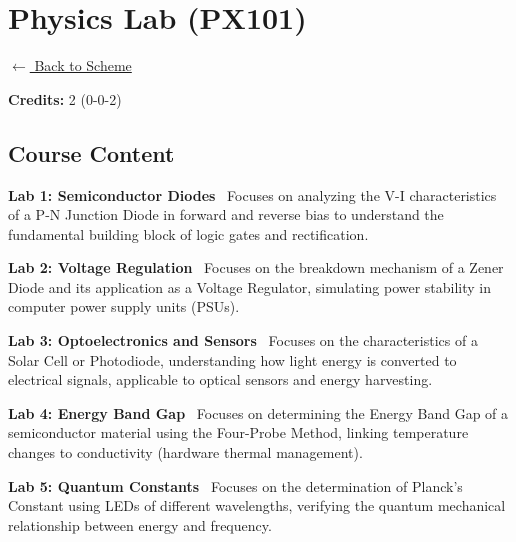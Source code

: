 \section*{Physics Lab (PX101)}
\label{course:PX101}

\noindent \small{\hyperref[main:scheme]{$\leftarrow$ Back to Scheme}} \vspace{0.5cm}

\noindent \textbf{Credits:} 2 (0-0-2)

\subsection*{Course Content}
\noindent\textbf{Lab 1: Semiconductor Diodes} \
Focuses on analyzing the V-I characteristics of a P-N Junction Diode in forward and reverse bias to understand the fundamental building block of logic gates and rectification. \\

\vspace{0.2cm}

\noindent\textbf{Lab 2: Voltage Regulation} \
Focuses on the breakdown mechanism of a Zener Diode and its application as a Voltage Regulator, simulating power stability in computer power supply units (PSUs). \\

\vspace{0.2cm}

\noindent\textbf{Lab 3: Optoelectronics and Sensors} \
Focuses on the characteristics of a Solar Cell or Photodiode, understanding how light energy is converted to electrical signals, applicable to optical sensors and energy harvesting. \\

\vspace{0.2cm}

\noindent\textbf{Lab 4: Energy Band Gap} \
Focuses on determining the Energy Band Gap of a semiconductor material using the Four-Probe Method, linking temperature changes to conductivity (hardware thermal management). \\

\vspace{0.2cm}

\noindent\textbf{Lab 5: Quantum Constants} \
Focuses on the determination of Planck’s Constant using LEDs of different wavelengths, verifying the quantum mechanical relationship between energy and frequency. \\

